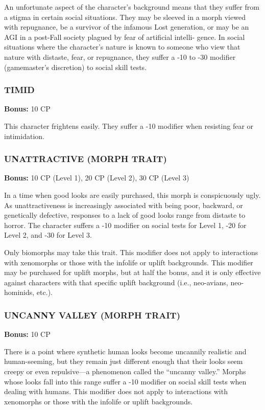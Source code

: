 An unfortunate aspect of the character’s background means that they suffer
from a stigma in certain social situations. They may be sleeved in a morph
viewed with repugnance, be a survivor of the infamous Lost generation, or may
be an AGI in a post-Fall society plagued by fear of artificial intelli-
gence. In social situations where the character’s nature is known to someone
who view that nature with distaste, fear, or repugnance, they suffer a -10 to
-30 modifier (gamemaster’s discretion) to social skill tests.

\subsubsection{TIMID}
\textbf{Bonus:} 10 CP

This character frightens easily. They suffer a -10 modifier when resisting fear
or intimidation.

\subsubsection{UNATTRACTIVE (MORPH TRAIT)}
\textbf{Bonus:} 10 CP (Level 1), 20 CP (Level 2), 30 CP (Level 3)

In a time when good looks are easily purchased, this morph is conspicuously
ugly. As unattractiveness is increasingly associated with being poor, backward,
or genetically defective, responses to a lack of good looks range from distaste
to horror. The character suffers a -10 modifier on social tests for Level 1,
-20 for Level 2, and -30 for Level 3.

Only biomorphs may take this trait. This modifier does not apply to
interactions with xenomorphs or those with the infolife or uplift
backgrounds. This modifier may be purchased for uplift morphs, but at half the
bonus, and it is only effective against characters with that specific uplift
background (i.e., neo-avians, neo-hominids, etc.).

\subsubsection{UNCANNY VALLEY (MORPH TRAIT)}
\textbf{Bonus:} 10 CP

There is a point where synthetic human looks become uncannily realistic and
human-seeming, but they remain just different enough that their looks seem
creepy or even repulsive—a phenomenon called the “uncanny valley.” Morphs whose
looks fall into this range suffer a -10 modifier on social skill tests when
dealing with humans. This modifier does not apply to interactions with
xenomorphs or those with the infolife or uplift backgrounds.

